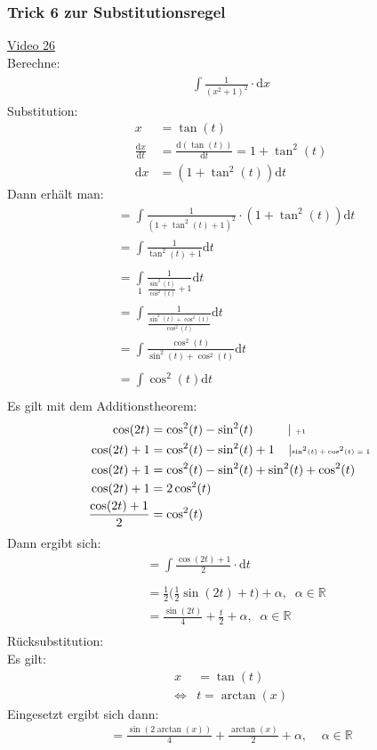 \subsubsection{Trick 6 zur Substitutionsregel}
\href{https://youtu.be/b8ivYOZW2XE}{Video 26}\\
Berechne:\\
\begin{align*}
\int\limits_{}^{} \frac{1}{(x^2+1)^2}\cdot \mathrm{d}x
\end{align*}
Substitution:\\
\begin{align*}
x&=\tan(t)\\
\frac{\mathrm{d}x}{\mathrm{d}t}&=\frac{\mathrm{d}(\tan(t))}{\mathrm{d}t}=1+\tan^2(t)\\
\mathrm{d}x&=(1+\tan^2(t))\mathrm{d}t
\end{align*}
Dann erhält man:\\
\begin{align*}
&=\int\limits_{}^{} \frac{1}{(1+\tan^2(t)+1)^2}\cdot (1+\tan^2(t))\mathrm{d}t\\
&=\int\limits_{}^{} \frac{1}{\tan^2(t)+1}\mathrm{d}t\\
&=\int\limits_{1}^{}\frac{1}{\frac{\sin^2(t)}{\cos^2(t)}+1}\mathrm{d}t \\
&=\int\limits_{}^{} \frac{1}{\frac{\sin^2(t)+\cos^2(t)}{\cos^2(t)}}\mathrm{d}t\\
&=\int\limits_{}^{} \frac{\cos^2(t)}{\sin^2(t)+\cos^2(t)}\mathrm{d}t\\
&=\int\limits_{}^{} \cos^2(t)\mathrm{d}t
\end{align*}
Es gilt mit dem Additionstheorem:\\
\begin{align*}
\cos (2t)&=\cos^2(t)-\sin^2(t)\;\;\;\;\;\;\;\;\;\;\lvert \text{ \tiny +1}\\
\cos (2t)+1&=\cos^2(t)-\sin^2(t)+1\;\;\;\;\lvert \text{\tiny$ \sin^2(t)+\cos^2 (t)=1 $ }\\
\cos (2t)+1&=\cos^2(t)-\sin^2(t)+\sin^2(t)+\cos^2 (t)\\
\cos (2t)+1&=2\cos^2(t)\\
\frac{\cos(2t)+1}{2}&=\cos^2(t)
\end{align*}
Dann ergibt sich:\\
\begin{align*}
&=\int\limits_{}^{} \frac{\cos(2t)+1}{2}\cdot \mathrm{d}t\\
&=\frac{1}{2}\bigg(\frac{1}{2}\sin(2t)+t\bigg)+\alpha,\;\; \alpha\in\mathbb{R}\\
&=\frac{\sin(2t)}{4}+\frac{t}{2}+\alpha,\;\; \alpha\in\mathbb{R}\\
\end{align*}
Rücksubstitution:\\
Es gilt:\\
\begin{align*}
x&=\tan(t)\\
\Leftrightarrow&t=\arctan(x)
\end{align*}
Eingesetzt ergibt sich dann:\\
\begin{align*}
=\frac{\sin(2\arctan(x))}{4}+\frac{\arctan(x)}{2}+\alpha,\;\;\;\;\alpha\in\mathbb{R}
\end{align*}
